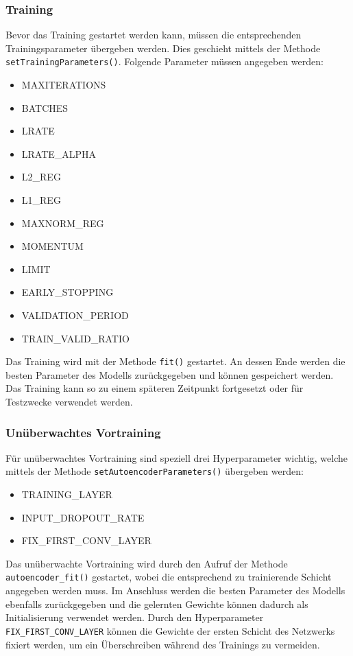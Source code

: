 \subsubsection{Training}
\label{ch:pytraining}
Bevor das Training gestartet werden kann, müssen die entsprechenden Trainingsparameter übergeben werden. Dies geschieht mittels der Methode \texttt{set\-Training\-Parameters()}. Folgende Parameter müssen angegeben werden:
\begin{multicols}{2}
\begin{itemize}
\item MAXITERATIONS  
\item BATCHES 
\item LRATE  
\item LRATE\_ALPHA
\item L2\_REG
\item L1\_REG
\item MAXNORM\_REG
\item MOMENTUM
\item LIMIT 
\item EARLY\_STOPPING
\item VALIDATION\_PERIOD
\item TRAIN\_VALID\_RATIO 
\end{itemize}
\end{multicols}

Das Training wird mit der Methode \texttt{fit()} gestartet. An dessen Ende werden die besten Parameter des Modells zurückgegeben und können gespeichert werden. Das Training kann so zu einem späteren Zeitpunkt fortgesetzt oder für Testzwecke verwendet werden.

\subsubsection{Unüberwachtes Vortraining}
Für unüberwachtes Vortraining sind speziell drei Hyperparameter wichtig, welche mittels der Methode \texttt{setAutoencoderParameters()} übergeben werden:

\begin{multicols}{2}
\begin{itemize}
\item TRAINING\_LAYER
\item INPUT\_DROPOUT\_RATE
\item FIX\_FIRST\_CONV\_LAYER
\end{itemize}
\end{multicols}

Das unüberwachte Vortraining wird durch den Aufruf der Methode \texttt{auto\-encoder\-\_fit()} gestartet, wobei die entsprechend zu trainierende Schicht angegeben werden muss. Im Anschluss werden die besten Parameter des Modells ebenfalls zurückgegeben und die gelernten Gewichte können dadurch als Initialisierung verwendet werden. Durch den Hyperparameter \texttt{FIX\-\_FIRST\-\_CONV\-\_LAYER} können die Gewichte der ersten Schicht des Netzwerks fixiert werden, um ein Überschreiben während des Trainings zu vermeiden.

